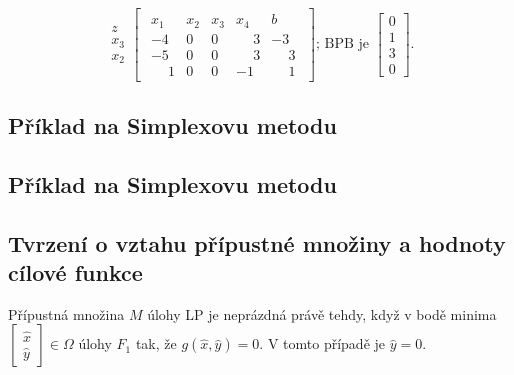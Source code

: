 \begin{equation*}
    \begin{array}{c}
        \\
        z \\
        x_3 \\
        x_2 \\
    \end{array}
    \begin{bmatrix}
        \begin{array}{cccc|c}
            x_1 & x_2 & x_3 & x_4 & b \\ \hline
            -4 & 0 & 0 & \phantom{-}3 & -3 \\ \hline
            -5 & 0 & 0 & \phantom{-}3 & \phantom{-}3  \\
            \phantom{-}1 & 0 & 0 & -1 & \phantom{-}1
        \end{array}
    \end{bmatrix}
    \text{; BPB je }
    \begin{bmatrix}
        0 \\
        1 \\
        3 \\
        0
    \end{bmatrix}.
\end{equation*}

\subsection{Příklad na Simplexovu metodu}

\subsection{Příklad na Simplexovu metodu}

\subsection{Tvrzení o vztahu přípustné množiny a hodnoty cílové funkce}
Přípustná množina $M$ úlohy LP je neprázdná právě tehdy, když v bodě minima 
$\begin{bmatrix} \hat x \\ \hat y \end{bmatrix} \in \Omega$ úlohy $F_1$ tak, že $g(\hat x, \hat y) = 0$.
V tomto případě je $\hat y = 0$.

